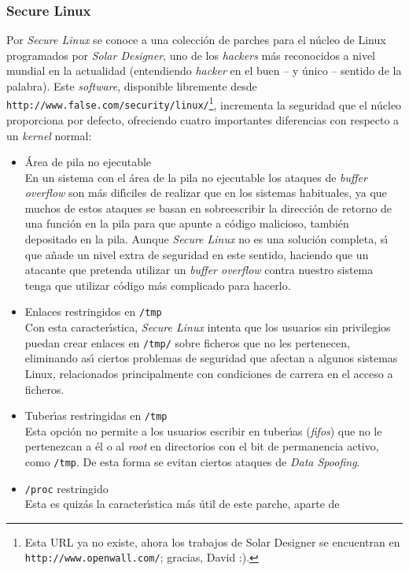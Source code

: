 \subsubsection{Secure Linux}
Por {\it Secure Linux} se conoce a una colecci\'on de parches para el n\'ucleo 
de Linux programados por {\it Solar Designer}, uno de los {\it hackers} m\'as
reconocidos a nivel mundial en la actualidad (entendiendo {\it hacker} en el
buen -- y \'unico -- sentido de la palabra). Este {\it software}, disponible
libremente desde {\tt http://www.false.com/security/linux/}\footnote{Esta
URL ya no existe, ahora los trabajos de Solar Designer se encuentran en
{\tt http://www.openwall.com/}; gracias, David :).}, incrementa
la seguridad que el n\'ucleo proporciona por defecto, ofreciendo cuatro 
importantes diferencias con respecto a un {\it kernel} normal:
\begin{itemize}
\item \'Area de pila no ejecutable\\
En un sistema con el \'area de la pila no ejecutable los ataques de {\it buffer 
overflow} son m\'as dif\'{\i}ciles de realizar que en los sistemas habituales,
ya que muchos de estos ataques se basan en sobreescribir la direcci\'on de 
retorno de una funci\'on en la pila para que apunte a c\'odigo malicioso, 
tambi\'en depositado en la pila. Aunque {\it Secure Linux} no es una soluci\'on
completa, s\'{\i} que a\~nade un nivel extra de seguridad en este sentido,
haciendo que un atacante que pretenda utilizar un {\it buffer overflow} contra
nuestro sistema tenga que utilizar c\'odigo m\'as complicado para hacerlo.
\item Enlaces restringidos en {\tt /tmp}\\
Con esta caracter\'{\i}stica, {\it Secure Linux} intenta que los usuarios sin
privilegios puedan crear enlaces en {\tt /tmp/} sobre ficheros que no les
pertenecen, eliminando as\'{\i} ciertos problemas de seguridad que afectan a
algunos sistemas Linux, relacionados principalmente con condiciones de carrera 
en el acceso a ficheros.
\item Tuber\'{\i}as restringidas en {\tt /tmp}\\
Esta opci\'on no permite a los usuarios escribir en tuber\'{\i}as ({\it fifos})
que no le pertenezcan a \'el o al {\it root} en directorios con el bit de
permanencia activo, como {\tt /tmp}. De esta forma se evitan ciertos ataques de 
{\it Data Spoofing}.
\item {\tt /proc} restringido\\
Esta es quiz\'as la caracter\'{\i}stica m\'as \'util de este parche, aparte de

\end{itemize}
